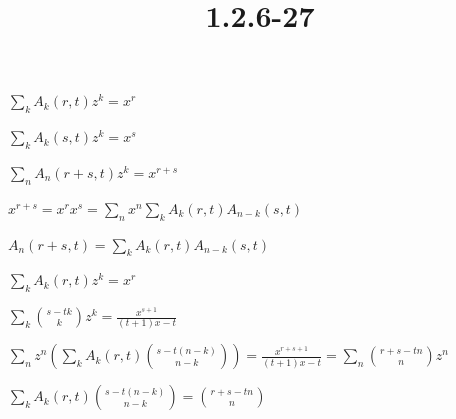 \documentclass{article}
\title{1.2.6-27}
\begin{document}
\maketitle

\( \sum_{k} A_k(r,t)z^k = x^r \)

\( \sum_{k} A_k(s,t)z^k = x^s \)

\( \sum_{n} A_n(r+s,t)z^k = x^{r+s} \)

\( x^{r+s} = x^r x^s = \sum_{n} x^n \sum_{k} A_k(r,t)A_{n-k}(s,t) \)

\( A_n(r+s,t) = \sum_{k} A_k(r,t)A_{n-k}(s,t) \)

\( \sum_{k} A_k(r,t)z^k = x^r \)

\( \sum_k \binom{s-tk}{k}z^k = \frac{x^{s+1}}{(t+1)x-t} \)

\( \sum_{n} z^n (\sum_k A_k(r,t) \binom{s-t(n-k)}{n-k}) = \frac{x^{r+s+1}}{(t+1)x - t} = \sum_{n}\binom{r+s-tn}{n}z^n \)

\( \sum_k A_k(r,t) \binom{s-t(n-k)}{n-k} = \binom{r+s-tn}{n} \)
\end{document}
